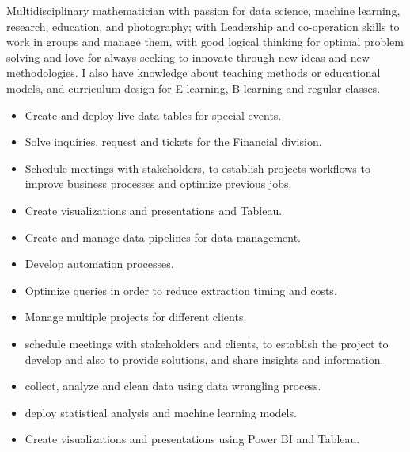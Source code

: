 \documentclass[10pt,a4paper,ragged2e, withhyper]{altacv}
\begin{document}
Multidisciplinary mathematician with passion for data science, machine
learning, research, education, and photography; with
Leadership and co-operation skills to work in groups and manage them, with good logical thinking for optimal
problem solving and love for always seeking to innovate through new ideas and
new methodologies.
I also have knowledge about teaching methods or educational models, and curriculum design for E-learning, B-learning and regular classes. 
\begin{paracol}{2}

\begin{itemize}
    \item Create and deploy live data tables for special events.
    \item Solve inquiries, request and tickets for the Financial division.
    \item Schedule meetings with stakeholders, to establish projects workflows to improve business processes and optimize previous jobs.
    \item Create visualizations and presentations and Tableau.
    \item Create and manage data pipelines for data management.
    \item Develop automation processes.
    \item Optimize queries in order to reduce extraction timing and costs.
\end{itemize}
\vspace{0.2cm}
\begin{itemize}
    \item Manage multiple projects for different clients.
    \item schedule meetings with stakeholders and clients, to establish the project to develop and also to provide solutions, and share insights and information.
    \item collect, analyze and clean data using data wrangling process.
    \item deploy statistical analysis and machine learning models.
    \item Create visualizations and presentations using Power BI and Tableau.
\end{itemize}
\vspace{0.2cm}


\end{paracol}
\end{document}
